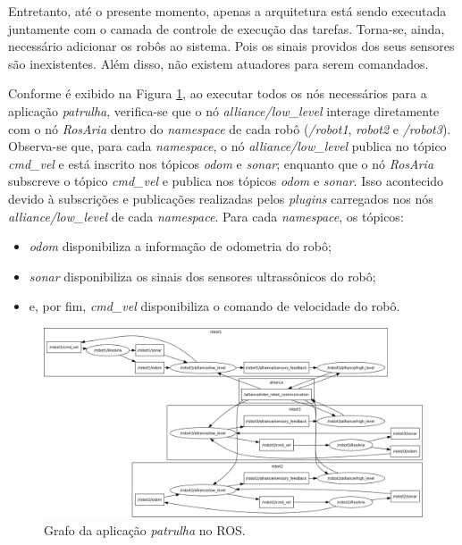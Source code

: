             Entretanto, até o presente momento, apenas a arquitetura está sendo executada juntamente com o camada de controle de execução das tarefas. Torna-se, ainda, necessário adicionar os robôs ao sistema. Pois os sinais providos dos seus sensores são inexistentes. Além disso, não existem atuadores para serem comandados.
            
            Conforme é exibido na Figura \ref{fig:patrulha_rosgraph}, ao executar todos os nós necessários para a aplicação \textit{patrulha}, verifica-se que o nó \textit{alliance/low\_level} interage diretamente com o nó \textit{RosAria} dentro do \textit{namespace} de cada robô (\textit{/robot1}, \textit{robot2} e \textit{/robot3}). Observa-se que, para cada \textit{namespace}, o nó \textit{alliance/low\_level} publica no tópico \textit{cmd\_vel} e está inscrito nos tópicos \textit{odom} e \textit{sonar}; enquanto que o nó \textit{RosAria} subscreve o tópico \textit{cmd\_vel} e publica nos tópicos \textit{odom} e \textit{sonar}. Isso acontecido devido à subscrições e publicações realizadas pelos \textit{plugins} carregados nos nós \textit{alliance/low\_level} de cada \textit{namespace}. Para cada \textit{namespace}, os tópicos:
            
            \begin{itemize}
                \item \textit{odom} disponibiliza a informação de odometria do robô;
                
                \item \textit{sonar} disponibiliza os sinais dos sensores ultrassônicos do robô;
                
                \item e, por fim, \textit{cmd\_vel} disponibiliza o comando de velocidade do robô.
            \end{itemize}
        
            \begin{figure}[p]
                \centering
                \includegraphics[width=.95\textheight,angle=90]{Figuras/4_resultados/patrulha_rosgraph.png}
                \caption{Grafo da aplicação \textit{patrulha} no ROS.} \label{fig:patrulha_rosgraph}
            \end{figure}
            
